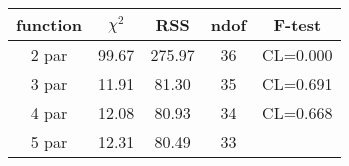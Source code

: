 \begin{tabular}{c|c|c|c|c}
function & $\chi^2$ & RSS & ndof & F-test \\
\hline
2 par & 99.67 & 275.97 & 36 & CL=0.000 \\
3 par & 11.91 & 81.30 & 35 & CL=0.691 \\
4 par & 12.08 & 80.93 & 34 & CL=0.668 \\
5 par & 12.31 & 80.49 & 33 & \\
\hline
\end{tabular}